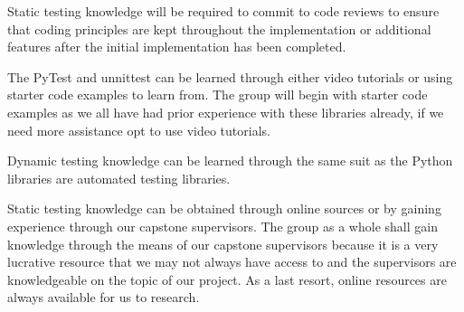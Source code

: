 \documentclass[12pt, titlepage]{article}
\begin{document}
Static testing knowledge will be required to commit to code reviews to ensure that coding principles are kept throughout the implementation or additional features after the initial implementation has been completed.

The PyTest and unnittest can be learned through either video tutorials or using starter code examples to learn from. The group will begin with starter code examples as we all have had prior experience with these libraries already, if we need more assistance opt to use video tutorials.

Dynamic testing knowledge can be learned through the same suit as the Python libraries are automated testing libraries.

Static testing knowledge can be obtained through online sources or by gaining experience through our capstone supervisors. The group as a whole shall gain knowledge through the means of our capstone supervisors because it is a very lucrative resource that we may not always have access to and the supervisors are knowledgeable on the topic of our project. As a last resort, online resources are always available for us to research. 
\end{document}
